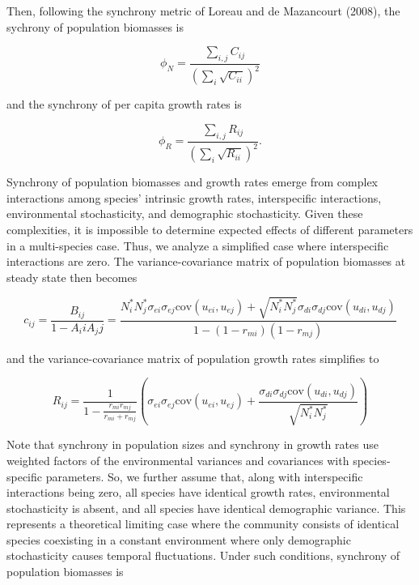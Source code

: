 \documentclass[12pt,]{article}
\begin{document}
\noindent Then, following the synchrony metric of Loreau and {{de
Mazancourt}} (2008), the sychrony of population biomasses is

\begin{equation}
\phi_N = \frac{\sum_{i,j}C_{ij}}{\left( \sum_i \sqrt{C_{ii}} \right)^2}
\end{equation}

\noindent and the synchrony of per capita growth rates is

\begin{equation}
\phi_R = \frac{\sum_{i,j}R_{ij}}{\left( \sum_i \sqrt{R_{ii}} \right)^2}.
\end{equation}

Synchrony of population biomasses and growth rates emerge from complex
interactions among species' intrinsic growth rates, interspecific
interactions, environmental stochasticity, and demographic
stochasticity. Given these complexities, it is impossible to determine
expected effects of different parameters in a multi-species case. Thus,
we analyze a simplified case where interspecific interactions are zero.
The variance-covariance matrix of population biomasses at steady state
then becomes

\begin{equation}
c_{ij} = \frac{B_{ij}}{1-A_ii A_jj} = \frac{N_{i}^* N_{j}^* \sigma_{ei} \sigma_{ej} \text{cov}(u_{ei},u_{ej}) + \sqrt{N_{i}^* N_{j}^*} \sigma_{di}\sigma_{dj} \text{cov}(u_{di},u_{dj})}{1 - (1-r_{mi})(1-r_{mj})}
\end{equation}

and the variance-covariance matrix of population growth rates simplifies
to

\begin{equation}
R_{ij} = \frac{1}{1- \frac{r_{mi}r_{mj}}{r_{mi}+r_{mj}}} \left( \sigma_{ei} \sigma_{ej} \text{cov}(u_{ei},u_{ej}) + \frac{\sigma_{di}\sigma_{dj} \text{cov}(u_{di},u_{dj})}{\sqrt{N_{i}^* N_{j}^*}} \right)
\end{equation}

\noindent Note that synchrony in population sizes and synchrony in
growth rates use weighted factors of the environmental variances and
covariances with species-specific parameters. So, we further assume
that, along with interspecific interactions being zero, all species have
identical growth rates, environmental stochasticity is absent, and all
species have identical demographic variance. This represents a
theoretical limiting case where the community consists of identical
species coexisting in a constant environment where only demographic
stochasticity causes temporal fluctuations. Under such conditions,
synchrony of population biomasses is
\end{document}
